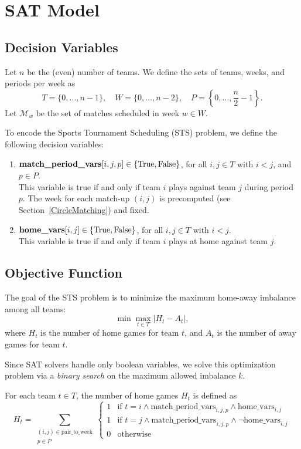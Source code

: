 


\section{SAT Model}

\subsection{Decision Variables}
Let $n$ be the (even) number of teams. We define the sets of teams, weeks, and periods per week as
\[
T = \{0, \dots, n-1\}, \quad W = \{0, \dots, n-2\}, \quad P = \left\{0, \dots, \frac{n}{2} - 1\right\}.
\]
Let $\mathcal{M}_w$ be the set of matches scheduled in week $w \in W$.

To encode the Sports Tournament Scheduling (STS) problem, we define the following decision variables:
\begin{enumerate}
    \item $\text{\textbf{match\_period\_vars}}[i,j,p] \in \{\mathrm{True}, \mathrm{False}\}$, for all $i,j \in T$ with $i < j$, and $p \in P$. \\
    This variable is true if and only if team $i$ plays against team $j$ during period $p$. The week for each match-up $(i,j)$ is precomputed (see Section~\ref{CircleMatching}) and fixed.
    
    \item $\text{\textbf{home\_vars}}[i,j] \in \{\mathrm{True}, \mathrm{False}\}$, for all $i,j \in T$ with $i < j$. \\
    This variable is true if and only if team $i$ plays at home against team $j$.
\end{enumerate}

\subsection{Objective Function}
The goal of the STS problem is to minimize the maximum home-away imbalance among all teams:
\[
\min \max_{t \in T} |H_t - A_t|,
\]
where $H_t$ is the number of home games for team $t$, and $A_t$ is the number of away games for team $t$.

Since SAT solvers handle only boolean variables, we solve this optimization problem via a \emph{binary search} on the maximum allowed imbalance $k$.

For each team $t \in T$, the number of home games $H_t$ is defined as
\[
H_t = \sum_{\substack{(i,j) \in \text{pair\_to\_week} \\ p \in P}}
\begin{cases}
1 & \text{if } t = i \land \text{match\_period\_vars}_{i,j,p} \land \text{home\_vars}_{i,j} \\
1 & \text{if } t = j \land \text{match\_period\_vars}_{i,j,p} \land \neg \text{home\_vars}_{i,j} \\
0 & \text{otherwise}
\end{cases}
\]

